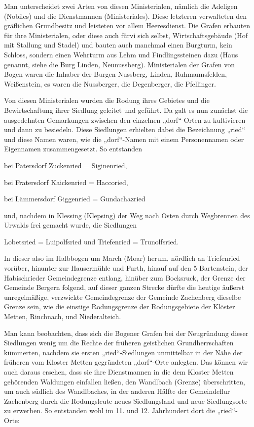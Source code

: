 \documentclass[12pt,a4pager]{book}
\begin{document}
Man unterscheidet zwei Arten von diesen Ministerialen, nämlich die Adeligen
(Nobiles) und die Dienstmannen (Ministeriales). Diese letzteren verwalteten den
gräflichen Grundbesitz und leisteten vor allem Heeresdienst. Die Grafen erbauten
für ihre Ministerialen, oder diese auch fürvi sich selbst, Wirtschaftsgebäude
(Hof mit Stallung und Stadel) und bauten auch manchmal einen Burgturm, kein
Schloss, sondern einen Wehrturm aus Lehm und Findlingssteinen dazu (Haus
genannt, siehe die Burg Linden, Neunussberg). Ministerialen der Grafen von Bogen
waren die Inhaber der Burgen Nussberg, Linden, Ruhmannsfelden, Weißenstein, es
waren die Nussberger, die Degenberger, die Pfellinger.

Von diesen Ministerialen wurden die Rodung ihres Gebietes und die
Bewirtschaftung ihrer Siedlung geleitet und geführt. Da galt es nun zunächst die
ausgedehnten Gemarkungen zwischen den einzelnen „dorf“-Orten zu kultivieren und
dann zu besiedeln. Diese Siedlungen erhielten dabei die Bezeichnung „ried“ und
diese Namen waren, wie die „dorf“-Namen mit einem Personennamen oder Eigennamen
zusammengesetzt. So entstanden

bei Patersdorf Zuckenried = Siginenried,

bei Fratersdorf Kaickenried = Haccoried,

bei Lämmersdorf Giggenried = Gundachazried

und, nachdem in Klessing (Klepsing) der Weg nach Osten durch Wegbrennen des
Urwalds frei gemacht wurde, die Siedlungen

Lobetsried = Luipolfsried und Triefenried = Trunolfsried.

In dieser also im Halbbogen um March (Moar) herum, nördlich an Triefenried
vorüber, hinunter zur Hausermühle und Furth, hinauf auf den 5 Bartenstein, der
Habischrieder Gemeindegrenze entlang, hinüber zum Bocksruck, der Grenze der
Gemeinde Bergern folgend, auf dieser ganzen Strecke dürfte die heutige äußerst
unregelmäßige, verzwickte Gemeindegrenze der Gemeinde Zachenberg dieselbe Grenze
sein, wie die einstige Rodungsgrenze der Rodungsgebiete der Klöster Metten,
Rinchnach, und Niederalteich.

Man kann beobachten, dass sich die Bogener Grafen bei der Neugründung dieser
Siedlungen wenig um die Rechte der früheren geistlichen Grundherrschaften
kümmerten, nachdem sie ersten „ried“-Siedlungen unmittelbar in der Nähe der
früheren vom Kloster Metten gegründeten „dorf“-Orte anlegten. Das können wir
auch daraus ersehen, dass sie ihre Dienstmannen in die dem Kloster Metten
gehörenden Waldungen einfallen ließen, den Wandlbach (Grenze) überschritten, um
auch südlich des Wandlbaches, in der anderen Hälfte der Gemeindeflur Zachenberg
durch die Rodungsleute neues Siedlungsland und neue Siedlungsorte zu erwerben.
So entstanden wohl im 11. und 12. Jahrhundert dort die „ried“-Orte:
\end{document}
